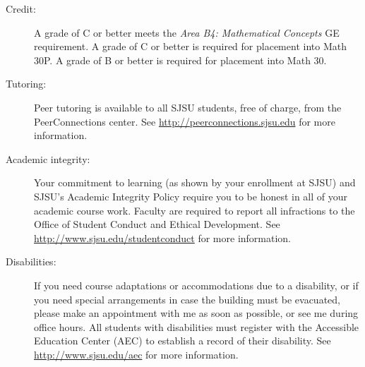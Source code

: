 \documentclass[letterpaper,12pt,fleqn]{article}
\begin{document}
\begin{description}
\item[Credit:] A grade of C or better meets the \emph{Area B4: Mathematical Concepts} GE
  requirement. A grade of C or better is required for placement into Math 30P. A grade
  of B or better is required for placement into Math 30.

\item[Tutoring:] Peer tutoring is available to all SJSU students, free of charge, from
  the PeerConnections center. See \url{http://peerconnections.sjsu.edu} for more
  information.

\item[Academic integrity:] Your commitment to learning (as shown by your enrollment at
  SJSU) and SJSU's Academic Integrity Policy require you to be honest in all of your
  academic course work.  Faculty are required to report all infractions to the Office of
  Student Conduct and Ethical Development. See \url{http://www.sjsu.edu/studentconduct}
  for more information.

\item[Disabilities:] If you need course adaptations or accommodations due to a
  disability, or if you need special arrangements in case the building must be
  evacuated, please make an appointment with me as soon as possible, or see me during
  office hours. All students with disabilities must register with the Accessible
  Education Center (AEC) to establish a record of their disability. See
  \url{http://www.sjsu.edu/aec} for more information.

\end{description}
\end{document}
